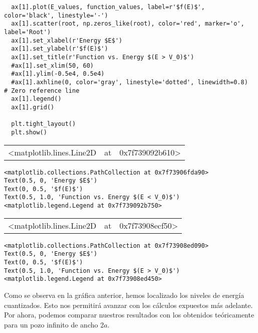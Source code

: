 \documentclass[11pt]{article}
\begin{document}
\begin{verbatim}
  ax[1].plot(E_values, function_values, label=r'$f(E)$', color='black', linestyle='-')
  ax[1].scatter(root, np.zeros_like(root), color='red', marker='o', label='Root')
  ax[1].set_xlabel(r'Energy $E$')
  ax[1].set_ylabel(r'$f(E)$')
  ax[1].set_title(r'Function vs. Energy $(E > V_0)$')
  #ax[1].set_xlim(50, 60)
  #ax[1].ylim(-0.5e4, 0.5e4)
  #ax[1].axhline(0, color='gray', linestyle='dotted', linewidth=0.8)  # Zero reference line
  ax[1].legend()
  ax[1].grid()

  plt.tight_layout()
  plt.show()
\end{verbatim}

\label{orge78ec3e}
\begin{center}
\begin{tabular}{lll}
<matplotlib.lines.Line2D & at & 0x7f739092b610>\\
\end{tabular}
\end{center}
\begin{verbatim}
<matplotlib.collections.PathCollection at 0x7f73906fda90>
Text(0.5, 0, 'Energy $E$')
Text(0, 0.5, '$f(E)$')
Text(0.5, 1.0, 'Function vs. Energy $(E < V_0)$')
<matplotlib.legend.Legend at 0x7f739092b750>
\end{verbatim}

\begin{center}
\begin{tabular}{lll}
<matplotlib.lines.Line2D & at & 0x7f73908ecf50>\\
\end{tabular}
\end{center}
\begin{verbatim}
<matplotlib.collections.PathCollection at 0x7f73908ed090>
Text(0.5, 0, 'Energy $E$')
Text(0, 0.5, '$f(E)$')
Text(0.5, 1.0, 'Function vs. Energy $(E > V_0)$')
<matplotlib.legend.Legend at 0x7f73908ed450>
\end{verbatim}

\begin{center}

\end{center}

Como se observa en la gráfica anterior, hemos localizado los niveles de
energía cuantizados. Esto nos permitirá avanzar con los cálculos
expuestos más adelante. Por ahora, podemos comparar nuestros resultados
con los obtenidos teóricamente para un pozo infinito de ancho \(2a\).
\end{document}
